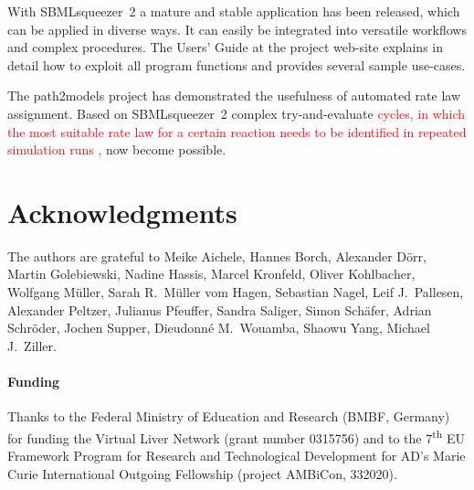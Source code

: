 \documentclass{bioinfo}
\begin{document}
With SBMLsqueezer~2 a mature and stable application has been released, which can be applied in diverse ways.
It can easily be integrated into versatile workflows and complex procedures.
The Users' Guide at the project web-site
explains in detail
how to exploit all program functions 
and provides several sample use-cases.

The path2models project \citep{Buechel2013} has demonstrated the usefulness of automated rate law assignment.
Based on SBMLsqueezer~2
complex try-and-evaluate \textcolor{red}{cycles, in which the most suitable rate law for a certain reaction needs to be identified in repeated simulation runs \citep{Draeger2011},} now become possible.

\vspace{-.2cm}
\section*{Acknowledgments}

The authors are grateful to Meike Aichele, Hannes Borch, Alexander D\"orr, Martin Golebiewski, Nadine Hassis, Marcel Kronfeld, Oliver Kohlbacher, Wolfgang M\"uller, Sarah R.~M\"uller vom Hagen, Sebastian Nagel, Leif J.~Pallesen, Alexander Peltzer, Julianus Pfeuffer, Sandra Saliger, Simon Sch\"afer, Adrian Schr\"oder, Jochen Supper, Dieudonn\'e M.~Wouamba, Shaowu Yang, Michael J.~Ziller.

\paragraph{Funding\textcolon}
Thanks to the Federal Ministry of Education and Research (BMBF, Germany) for funding the
Virtual Liver Network (grant number 0315756) and to %
the 7\textsuperscript{th} EU Framework Program for Research and Technological Development
for AD's Marie Curie International Outgoing Fellowship
(project AMBiCon, 332020).
\end{document}
